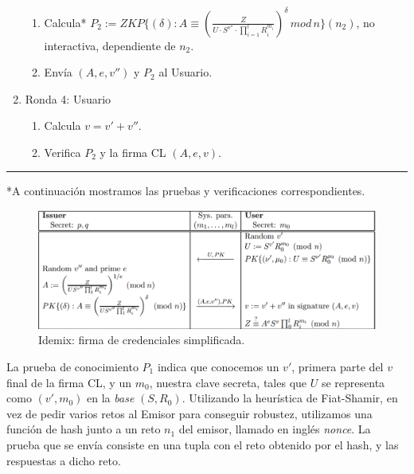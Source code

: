 \begin{algorithm}
\begin{enumerate}
\begin{enumerate}[label*=\arabic*.]
			\item Calcula* $P_2 := ZKP\{(\delta) : A \equiv \left( \frac{Z}{U\cdot S^{v''}\cdot \prod_{i=1}^{l} R_i^{m_i}} \right)^{\delta} \, mod \, n \}(n_2)$, no interactiva, dependiente de $n_2$.
			
			\item Envía $(A,e,v'')$ y $P_2$ al Usuario.
		\end{enumerate}
		
		
		\item Ronda 4: Usuario
		\begin{enumerate}[label*=\arabic*.]
			\item Calcula $v=v'+v''$.
			\item Verifica $P_2$ y la firma CL $(A,e,v)$.
		\end{enumerate}

	\end{enumerate}
	
\end{algorithm}
\rule{\textwidth}{1pt}



\begin{flushleft}
	*A continuación mostramos las pruebas y verificaciones correspondientes.
\end{flushleft}

\begin{figure}[bth]
	\begin{center}
		\includegraphics[width=0.8\linewidth]{gfx/issuanceIdemix}
	\end{center}
	\caption{Idemix: firma de credenciales simplificada.}
	\label{fig:issuanceIdemix}
\end{figure}

\hfil


La prueba de conocimiento $P_1$ indica que conocemos un $v'$, primera parte del $v$ final de la firma CL, y un $m_0$, nuestra clave secreta, tales que $U$ se representa como $(v', m_0)$ en la \textit{base} $(S,R_0)$. Utilizando la heurística de Fiat-Shamir, en vez de pedir varios retos al Emisor para conseguir robustez, utilizamos una función de hash junto a un reto $n_1$ del emisor, llamado en inglés \textit{nonce}. La prueba que se envía consiste en una tupla con el reto obtenido por el hash, y las respuestas a dicho reto.

